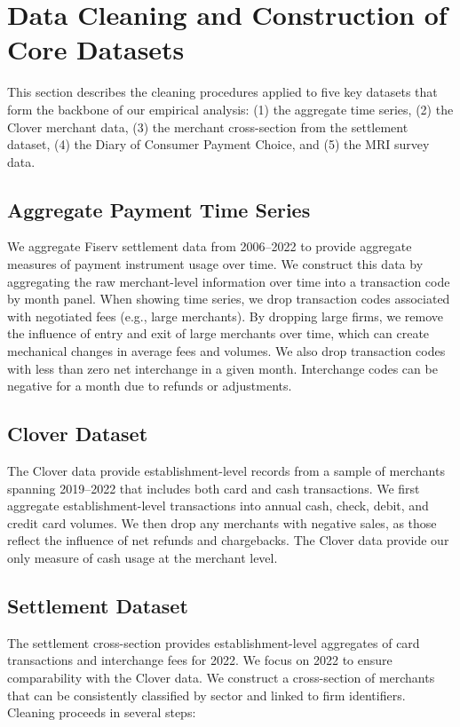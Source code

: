 \documentclass[main.tex]{subfiles}
\begin{document}
\section{Data Cleaning and Construction of Core Datasets}

This section describes the cleaning procedures applied to five key datasets that form the backbone of our empirical analysis: (1) the aggregate time series, (2) the Clover merchant data, (3) the merchant cross-section from the settlement dataset, (4) the Diary of Consumer Payment Choice, and (5) the MRI survey data.

\subsection{Aggregate Payment Time Series}

We aggregate Fiserv settlement data from 2006--2022 to provide aggregate measures of payment instrument usage over time.
We construct this data by aggregating the raw merchant-level information over time into a transaction code by month panel.
When showing time series, we drop transaction codes associated with negotiated fees (e.g., large merchants).
By dropping large firms, we remove the influence of entry and exit of large merchants over time, which can create mechanical changes in average fees and volumes.
We also drop transaction codes with less than zero net interchange in a given month.
Interchange codes can be negative for a month due to refunds or adjustments.

\subsection{Clover Dataset}

The Clover data provide establishment-level records from a sample of merchants spanning 2019--2022 that includes both card and cash transactions.
We first aggregate establishment-level transactions into annual cash, check, debit, and credit card volumes.
We then drop any merchants with negative sales, as those reflect the influence of net refunds and chargebacks.
The Clover data provide our only measure of cash usage at the merchant level.

\subsection{Settlement Dataset}

The settlement cross-section provides establishment-level aggregates of card transactions and interchange fees for 2022.
We focus on 2022 to ensure comparability with the Clover data.
We construct a cross-section of merchants that can be consistently classified by sector and linked to firm identifiers.
Cleaning proceeds in several steps:
\end{document}
